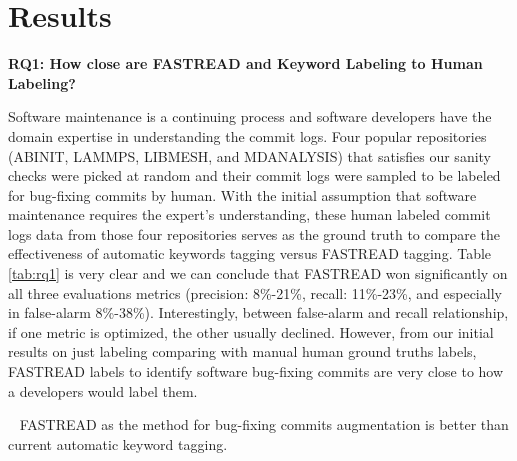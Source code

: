 \documentclass[sigconf,review, anonymous]{acmart}
\newenvironment{RQ}[1]%
{\noindent\begin{minipage}[c]{\linewidth}%
\begin{bclogo}[couleur=gray!25,%
                arrondi=0.1,%
                logo=\bctrombone,%
                ombre=true]{~#1}}%
{\end{bclogo}\end{minipage}\vspace{2mm}}
\begin{document}



\section{Results}



\textbf{RQ1: { How close are FASTREAD and Keyword Labeling to Human Labeling?}}
 
Software maintenance is a continuing process and software developers have the domain expertise in understanding the commit logs. Four popular repositories (ABINIT, LAMMPS, LIBMESH, and MDANALYSIS) that satisfies our sanity checks were picked at random and their commit logs were sampled to be labeled for bug-fixing commits by human. With the initial assumption that software maintenance requires the expert's understanding, these human labeled commit logs data from those four repositories serves as the ground truth to compare the effectiveness of automatic keywords tagging versus FASTREAD tagging. Table \ref{tab:rq1} is very clear and we can conclude that FASTREAD won significantly on all three evaluations metrics (precision: 8\%-21\%, recall: 11\%-23\%, and especially in false-alarm 8\%-38\%). Interestingly, between false-alarm and recall relationship, if one metric is optimized, the other usually declined. However, from our initial results on just labeling comparing with manual human ground truths labels, FASTREAD labels to identify software bug-fixing commits are very close to how a developers would label them. 

\begin{RQ}{}
\vspace{-10pt}
FASTREAD as the method for bug-fixing commits augmentation is better than current automatic keyword tagging.
\end{RQ}
\end{document}
